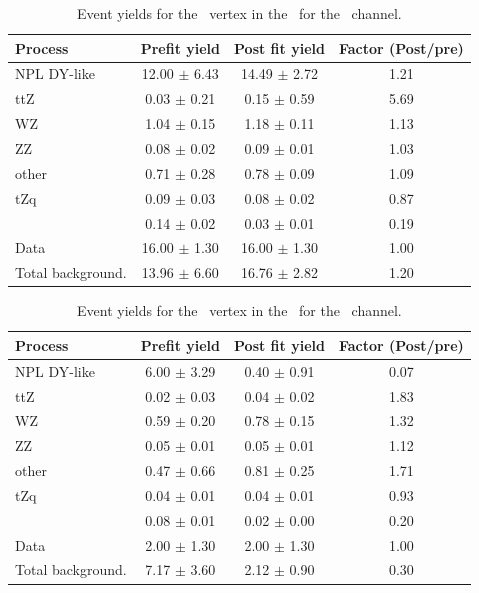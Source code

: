 \begin{table}[htbp]
	\centering
	\caption{Event yields for the \Zut\ vertex in the \STCR\  for the \emumu\ channel. }
	\begin{tabular} {l c c c }
		\toprule
		Process & Prefit yield & Post fit yield & Factor (Post/pre) \\
		\midrule
		NPL DY-like & 12.00 $ \pm $ 6.43 & 14.49 $ \pm $ 2.72 & 1.21 \\ 
		ttZ & 0.03 $ \pm $ 0.21 & 0.15 $ \pm $ 0.59 & 5.69 \\ 
		WZ & 1.04 $ \pm $ 0.15 & 1.18 $ \pm $ 0.11 & 1.13 \\ 
		ZZ & 0.08 $ \pm $ 0.02 & 0.09 $ \pm $ 0.01 & 1.03 \\ 
		other & 0.71 $ \pm $ 0.28 & 0.78 $ \pm $ 0.09 & 1.09 \\ 
		tZq & 0.09 $ \pm $ 0.03 & 0.08 $ \pm $ 0.02 & 0.87 \\ 
		\kZut  & 0.14 $ \pm $ 0.02 & 0.03 $ \pm $ 0.01 & 0.19\\
		\hdashline
		Data & 16.00 $ \pm $ 1.30 & 16.00 $ \pm $ 1.30 & 1.00\\
		Total background. & 13.96 $ \pm $ 6.60 & 16.76 $ \pm $ 2.82 & 1.20\\
		\bottomrule
	\end{tabular}
\end{table}
\begin{table}[htbp]
	\centering
	\caption{Event yields for the \Zut\ vertex in the \STCR\  for the \eemu\ channel. }
	\begin{tabular} {l c c c }
		\toprule
		Process & Prefit yield & Post fit yield & Factor (Post/pre) \\
		\midrule
		NPL DY-like & 6.00 $ \pm $ 3.29 & 0.40 $ \pm $ 0.91 & 0.07 \\ 
		ttZ & 0.02 $ \pm $ 0.03 & 0.04 $ \pm $ 0.02 & 1.83 \\ 
		WZ & 0.59 $ \pm $ 0.20 & 0.78 $ \pm $ 0.15 & 1.32 \\ 
		ZZ & 0.05 $ \pm $ 0.01 & 0.05 $ \pm $ 0.01 & 1.12 \\ 
		other & 0.47 $ \pm $ 0.66 & 0.81 $ \pm $ 0.25 & 1.71 \\ 
		tZq & 0.04 $ \pm $ 0.01 & 0.04 $ \pm $ 0.01 & 0.93 \\ 
		\kZut  & 0.08 $ \pm $ 0.01 & 0.02 $ \pm $ 0.00 & 0.20\\
		\hdashline
		Data & 2.00 $ \pm $ 1.30 & 2.00 $ \pm $ 1.30 & 1.00\\
		Total background. & 7.17 $ \pm $ 3.60 & 2.12 $ \pm $ 0.90 & 0.30\\
		\bottomrule
	\end{tabular}
\end{table}

